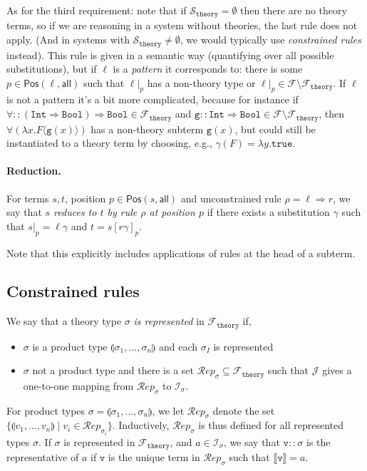 \documentclass{lmcs}
\theoremstyle{theorem}\newtheorem{theorem}{Theorem}
\theoremstyle{theorem}\newtheorem{lemma}[theorem]{Lemma}
\theoremstyle{theorem}\newtheorem{corollary}[theorem]{Corollary}
\theoremstyle{definition}\newtheorem{definition}[theorem]{Definition}
\theoremstyle{definition}\newtheorem{example}[theorem]{Example}
\newcommand{\F}{\mathcal{F}}
\newcommand{\thF}{\mathcal{F}_{\mathtt{theory}}}
\newcommand{\thSorts}{\mathcal{S}_{\mathtt{theory}}}
\newcommand{\Positions}{\mathsf{Pos}}
\newcommand{\I}{\mathcal{I}}
\newcommand{\J}{\mathcal{J}}
\newcommand{\Reps}[1]{\mathcal{R}\!\mathit{ep}_{#1}}
\newcommand{\atype}{\sigma}
\newcommand{\identifier}[1]{\mathtt{#1}}
\newcommand{\bfun}{\identifier{g}}
\newcommand{\avalue}{\identifier{v}}
\newcommand{\avar}{x}
\newcommand{\bvar}{y}
\newcommand{\AFvar}{F}
\newcommand{\abs}[2]{\lambda #1.#2}
\newcommand{\meta}[2]{#1\langle#2\rangle}
\newcommand{\tuple}[2]{\llparenthesis #1,\dots,#2 \rrparenthesis}
\newcommand{\arrtype}{\Rightarrow}
\newcommand{\arrz}{\Rightarrow}
\newcommand{\interpret}[1]{\llbracket #1 \rrbracket}
\newcommand{\symb}[1]{\mathtt{#1}}
\newcommand{\strue}{\symb{true}}
\newcommand{\bool}{\symb{Bool}}
\newcommand{\tint}{\symb{Int}}
\newcommand{\myparagraph}[1]{\paragraph{\textbf{#1.}}}
\begin{document}
As for the third requirement: note that if $\thSorts = \emptyset$ then there are
no theory terms, so if we are reasoning in a system without theories, the last
rule does not apply. (And in systems with $\thSorts \neq \emptyset$, we would
typically use \emph{constrained rules} instead).
This rule is given in a semantic way (quantifying over all possible
substitutions), but if $\ell$ is a \emph{pattern} it corresponds to: there is
some $p \in \Positions(\ell,\mathsf{all})$ such that $\ell|_p$ has a non-theory
type or $\ell|_p \in \F \setminus \thF$.  If $\ell$ is not a pattern it's a bit
more complicated, because for instance if $\forall :: (\tint \arrtype \bool)
\arrtype \bool \in \thF$ and $\bfun :: \tint \arrtype \bool \in \F \setminus
\thF$, then $\forall(\abs{\avar}{\meta{\AFvar}{\bfun(\avar)}})$ has a
non-theory subterm $\bfun(\avar)$, but could still be instantiated to a theory
term by choosing, e.g., $\gamma(\AFvar) = \abs{\bvar}{\strue}$.

\myparagraph{Reduction}
For terms $s,t$, position $p \in \Positions(s,\mathsf{all})$ and unconstrained
rule $\rho = \ell \arrz r$, we say that \emph{$s$ reduces to $t$ by rule $\rho$
at position $p$} if there exists a substitution $\gamma$ such that $s|_p =
\ell\gamma$ and $t = s[r\gamma]_p$.

Note that this explicitly includes applications of rules at the head of a
subterm.

\subsection{Constrained rules}

We say that a theory type $\atype$ \emph{is represented} in $\thF$ if,
\begin{itemize}
\item $\atype$ is a product type $\tuple{\atype_1}{\atype_n}$ and each
  $\atype_I$ is represented
\item $\atype$ not a product type and there is a set $\Reps{\atype} \subseteq
  \thF$ such that $\J$ gives a one-to-one mapping from $\Reps{\atype}$ to
  $\I_\atype$.
\end{itemize}
For product types $\atype = \tuple{\atype_1}{\atype_n}$, we let $\Reps{\atype}$
denote the set $\{ \tuple{v_1}{v_n} \mid v_i \in \Reps{\atype_i} \}$.
Inductively, $\Reps{\atype}$ is thus defined for all represented types $\atype$.
If $\atype$ is represented in $\thF$, and $a \in \I_\atype$, we say that
$\avalue :: \atype$ is the representative of $a$ if $\avalue$ is the unique term
in $\Reps{\atype}$ such that $\interpret{\avalue} = a$.
\end{document}
